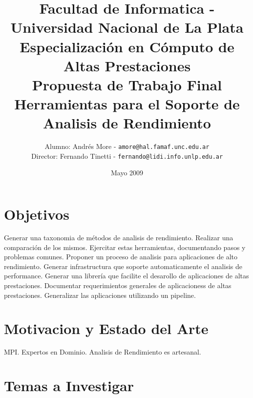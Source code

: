 \documentclass[a4paper,twocolumn]{article}
\begin{document}
\title{Facultad de Informatica - Universidad Nacional de La Plata\\Especializaci\'on en C\'omputo de Altas Prestaciones\\Propuesta de Trabajo Final\\Herramientas para el Soporte de Analisis de Rendimiento}
\author{Alumno: Andr\'es More - {\tt amore@hal.famaf.unc.edu.ar}\\Director: Fernando Tinetti - {\tt fernando@lidi.info.unlp.edu.ar}}
\date{Mayo 2009}


\tableofcontents

\section{Objetivos}

Generar una taxonomia de m\'etodos de analisis de rendimiento.
Realizar una comparaci\'on de los mismos.
Ejercitar estas herramientas, documentando pasos y problemas comunes.
Proponer un proceso de analisis para aplicaciones de alto rendimiento.
Generar infrastructura que soporte automaticamente el analisis de performance.
Generar una librer\'ia que facilite el desarollo de aplicaciones de altas prestaciones.
Documentar requerimientos generales de aplicacioness de altas prestaciones.
Generalizar las aplicaciones utilizando un pipeline.

\section{Motivacion y Estado del Arte}

MPI.
Expertos en Dominio.
Analisis de Rendimiento es artesanal.

\section{Temas a Investigar}
\end{document}
